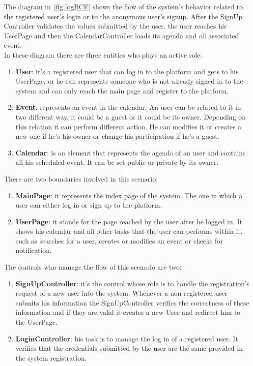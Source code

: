 \begin{itemize}
The diagram in~\ref{fig:logBCE} shows the flow of the system's behavior related to the registered user's login or to the anonymous user's signup. After the SignUp Controller validates the values submitted by the user, the user reaches his UserPage and then the CalendarController loads its agenda and all associated event. \\In these diagram there are three entities who plays an active role:
\begin{enumerate}
\item  {\bf User}: it's a registered user that can log in to the platform and gets to his UserPage, or he can represents someone who is not already signed in  to the system and can only reach the main page and register to the platform.
\item  {\bf Event}: represents an event in the calendar. An user can be related to it in two different way, it could be a guest or it could be its owner. Depending on this relation it can perform different action. He can modifies it or creates a new one if he's his owner or change his participation if he's a guest.
\item  {\bf Calendar}: is an element that represents the agenda of an user and contains all his scheduled event. It can be set public or private by its owner.
\end{enumerate}
There are two boundaries involved in this scenario: \begin{enumerate}
\item {\bf MainPage}: it represents the index page of the system. The one in which a user can either log in or sign up to the platform.
\item {\bf UserPage}: it stands for the page reached by the user after he logged in. It shows his calendar and all other tasks that the user can performs within it, such as searches for a user, creates or modifies an event or checks for notification.
 \end{enumerate}
The controls who manage the flow of this scenario are two:\begin{enumerate}
\item {\bf SignUpController}: it's the control whose role is to handle the registration's request of a new user into the system. Whenever a non registered user submits his information the SignUpController verifies the correctness of these information and if they are valid it creates a new User and redirect him to the UserPage.
\item {\bf LoginController}: his task is to manage the log in of a registered user. It verifies that the credentials submitted by the user are the same provided in the system registration.  

\end{enumerate}
\end{itemize}
